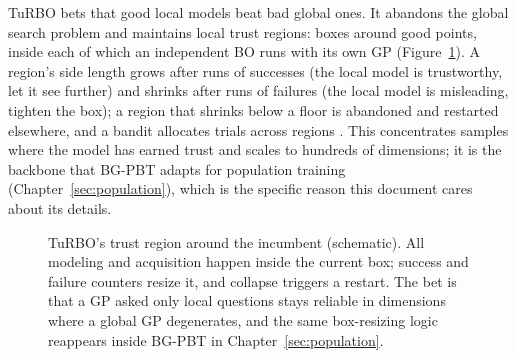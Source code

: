 TuRBO bets that good local models beat bad global ones. It abandons the
global search problem and maintains local trust regions: boxes around
good points, inside each of which an independent BO runs with its own GP
(Figure~\ref{fig:turbo}). A region's side length grows after runs of
successes (the local model is trustworthy, let it see further) and
shrinks after runs of failures (the local model is misleading, tighten
the box); a region that shrinks below a floor is abandoned and restarted
elsewhere, and a bandit allocates trials across regions
\citep{eriksson2019turbo}. This concentrates samples where the model has
earned trust and scales to hundreds of dimensions; it is the backbone
that BG-PBT adapts for population training (Chapter~\ref{sec:population}),
which is the specific reason this document cares about its details.

\begin{figure}[t]
\centering
{}
\caption{TuRBO's trust region around the incumbent (schematic). All
modeling and acquisition happen inside the current box; success and
failure counters resize it, and collapse triggers a restart. The bet is
that a GP asked only local questions stays reliable in dimensions where
a global GP degenerates, and the same box-resizing logic reappears
inside BG-PBT in Chapter~\ref{sec:population}.}
\label{fig:turbo}
\end{figure}


